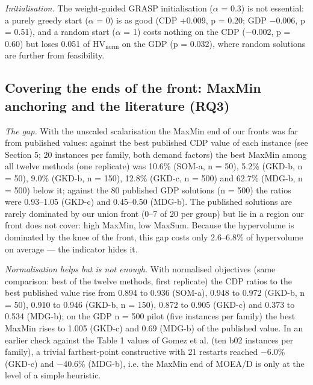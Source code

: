 \emph{Initialisation.} The weight-guided GRASP initialisation ($\alpha$ = 0.3) is not essential: a purely greedy start ($\alpha$ = 0) is as good (CDP +0.009, p = 0.20; GDP $-$0.006, p = 0.51), and a random start ($\alpha$ = 1) costs nothing on the CDP ($-$0.002, p = 0.60) but loses 0.051 of $\mathrm{HV}_{\mathrm{norm}}$ on the GDP (p = 0.032), where random solutions are further from feasibility.

\subsection{Covering the ends of the front: MaxMin anchoring and the literature (RQ3)}\label{sec:anchor_lit}

\emph{The gap.} With the unscaled scalarisation the MaxMin end of our fronts was far from published values: against the best published CDP value of each instance (see Section 5; 20 instances per family, both demand factors) the best MaxMin among all twelve methods (one replicate) was 10.6\% (SOM-a, n = 50), 5.2\% (GKD-b, n = 50), 9.0\% (GKD-b, n = 150), 12.8\% (GKD-c, n = 500) and 62.7\% (MDG-b, n = 500) below it; against the 80 published GDP solutions (n = 500) the ratios were 0.93--1.05 (GKD-c) and 0.45--0.50 (MDG-b). The published solutions are rarely dominated by our union front (0--7 of 20 per group) but lie in a region our front does not cover: high MaxMin, low MaxSum. Because the hypervolume is dominated by the knee of the front, this gap costs only 2.6--6.8\% of hypervolume on average --- the indicator hides it.

\emph{Normalisation helps but is not enough.} With normalised objectives (same comparison: best of the twelve methods, first replicate) the CDP ratios to the best published value rise from 0.894 to 0.936 (SOM-a), 0.948 to 0.972 (GKD-b, n = 50), 0.910 to 0.946 (GKD-b, n = 150), 0.872 to 0.905 (GKD-c) and 0.373 to 0.534 (MDG-b); on the GDP n = 500 pilot (five instances per family) the best MaxMin rises to 1.005 (GKD-c) and 0.69 (MDG-b) of the published value. In an earlier check against the Table 1 values of Gomez et al. (ten b02 instances per family), a trivial farthest-point constructive with 21 restarts reached $-$6.0\% (GKD-c) and $-$40.6\% (MDG-b), i.e. the MaxMin end of MOEA/D is only at the level of a simple heuristic.

